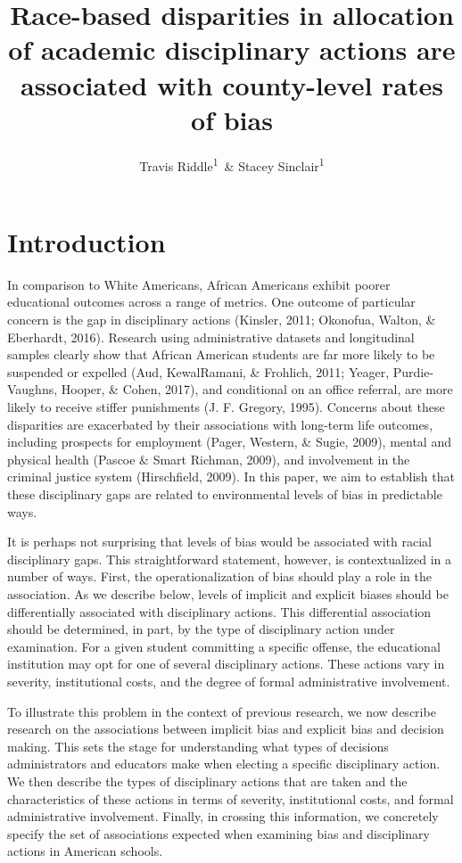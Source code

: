 \documentclass[english,floatsintext,man]{apa6}
\title{Race-based disparities in allocation of academic disciplinary actions
are associated with county-level rates of bias}
\author{Travis Riddle\textsuperscript{1}~\& Stacey Sinclair\textsuperscript{1}}
\affiliation{
    \vspace{0.5cm}
          \textsuperscript{1} Princeton University  }
\theoremstyle{definition}
\theoremstyle{definition}
\theoremstyle{remark}
\begin{document}
\maketitle

\setcounter{secnumdepth}{0}



\section{Introduction}\label{introduction}

In comparison to White Americans, African Americans exhibit poorer
educational outcomes across a range of metrics. One outcome of
particular concern is the gap in disciplinary actions (Kinsler, 2011;
Okonofua, Walton, \& Eberhardt, 2016). Research using administrative
datasets and longitudinal samples clearly show that African American
students are far more likely to be suspended or expelled (Aud,
KewalRamani, \& Frohlich, 2011; Yeager, Purdie-Vaughns, Hooper, \&
Cohen, 2017), and conditional on an office referral, are more likely to
receive stiffer punishments (J. F. Gregory, 1995). Concerns about these
disparities are exacerbated by their associations with long-term life
outcomes, including prospects for employment (Pager, Western, \& Sugie,
2009), mental and physical health (Pascoe \& Smart Richman, 2009), and
involvement in the criminal justice system (Hirschfield, 2009). In this
paper, we aim to establish that these disciplinary gaps are related to
environmental levels of bias in predictable ways.

It is perhaps not surprising that levels of bias would be associated
with racial disciplinary gaps. This straightforward statement, however,
is contextualized in a number of ways. First, the operationalization of
bias should play a role in the association. As we describe below, levels
of implicit and explicit biases should be differentially associated with
disciplinary actions. This differential association should be
determined, in part, by the type of disciplinary action under
examination. For a given student committing a specific offense, the
educational institution may opt for one of several disciplinary actions.
These actions vary in severity, institutional costs, and the degree of
formal administrative involvement.

To illustrate this problem in the context of previous research, we now
describe research on the associations between implicit bias and explicit
bias and decision making. This sets the stage for understanding what
types of decisions administrators and educators make when electing a
specific disciplinary action. We then describe the types of disciplinary
actions that are taken and the characteristics of these actions in terms
of severity, institutional costs, and formal administrative involvement.
Finally, in crossing this information, we concretely specify the set of
associations expected when examining bias and disciplinary actions in
American schools.
\end{document}
